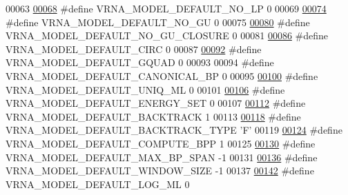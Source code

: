 \begin{DoxyCode}
00063 
\hypertarget{model_8h_source.tex_l00068}{}\hyperlink{group__model__details_gab72462726dd60ed0d43339bbf7ee08ad}{00068} \textcolor{preprocessor}{#define VRNA\_MODEL\_DEFAULT\_NO\_LP          0}
00069 
\hypertarget{model_8h_source.tex_l00074}{}\hyperlink{group__model__details_ga34702f7d14d38b877ba8e475281e97e2}{00074} \textcolor{preprocessor}{#define VRNA\_MODEL\_DEFAULT\_NO\_GU          0}
00075 
\hypertarget{model_8h_source.tex_l00080}{}\hyperlink{group__model__details_ga5308de46faaca4b9fd16045864901ee7}{00080} \textcolor{preprocessor}{#define VRNA\_MODEL\_DEFAULT\_NO\_GU\_CLOSURE  0}
00081 
\hypertarget{model_8h_source.tex_l00086}{}\hyperlink{group__model__details_ga22059033db7bcd875c51fec32425490a}{00086} \textcolor{preprocessor}{#define VRNA\_MODEL\_DEFAULT\_CIRC           0}
00087 
\hypertarget{model_8h_source.tex_l00092}{}\hyperlink{group__model__details_ga793ed812e86f43799b14b2deee917f23}{00092} \textcolor{preprocessor}{#define VRNA\_MODEL\_DEFAULT\_GQUAD          0}
00093 
00094 \textcolor{preprocessor}{#define VRNA\_MODEL\_DEFAULT\_CANONICAL\_BP   0}
00095 
\hypertarget{model_8h_source.tex_l00100}{}\hyperlink{group__model__details_ga63f6006a02ba2d89148441f406c309e7}{00100} \textcolor{preprocessor}{#define VRNA\_MODEL\_DEFAULT\_UNIQ\_ML        0}
00101 
\hypertarget{model_8h_source.tex_l00106}{}\hyperlink{group__model__details_ga6fcf6b2d0f89256cdbd166486c9b6e1e}{00106} \textcolor{preprocessor}{#define VRNA\_MODEL\_DEFAULT\_ENERGY\_SET     0}
00107 
\hypertarget{model_8h_source.tex_l00112}{}\hyperlink{group__model__details_ga3fda8006ab84baf817bd8e5ccbc6bb35}{00112} \textcolor{preprocessor}{#define VRNA\_MODEL\_DEFAULT\_BACKTRACK      1}
00113 
\hypertarget{model_8h_source.tex_l00118}{}\hyperlink{group__model__details_gad0e81fcaca53c4a826c68e0796de2afb}{00118} \textcolor{preprocessor}{#define VRNA\_MODEL\_DEFAULT\_BACKTRACK\_TYPE 'F'}
00119 
\hypertarget{model_8h_source.tex_l00124}{}\hyperlink{group__model__details_ga1d6cd5051940b126c248147c011bac6c}{00124} \textcolor{preprocessor}{#define VRNA\_MODEL\_DEFAULT\_COMPUTE\_BPP    1}
00125 
\hypertarget{model_8h_source.tex_l00130}{}\hyperlink{group__model__details_ga7cb6f4ae8fdebff6746a4410814f2977}{00130} \textcolor{preprocessor}{#define VRNA\_MODEL\_DEFAULT\_MAX\_BP\_SPAN    -1}
00131 
\hypertarget{model_8h_source.tex_l00136}{}\hyperlink{group__model__details_ga8de04a9cb57e811e313b0f9f207f6bdb}{00136} \textcolor{preprocessor}{#define VRNA\_MODEL\_DEFAULT\_WINDOW\_SIZE    -1}
00137 
\hypertarget{model_8h_source.tex_l00142}{}\hyperlink{group__model__details_ga938f68463e84fe060aa6502f428a517d}{00142} \textcolor{preprocessor}{#define VRNA\_MODEL\_DEFAULT\_LOG\_ML         0}

\end{DoxyCode}
